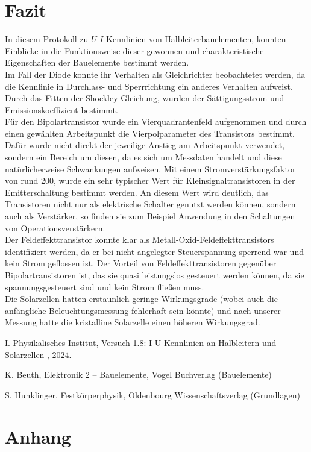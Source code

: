 \documentclass[12pt,a4paper,ngerman]{report}
\begin{document}
\chapter{Fazit}
In diesem Protokoll zu $U$-$I$-Kennlinien von Halbleiterbauelementen, konnten Einblicke in die Funktionsweise dieser gewonnen und charakteristische Eigenschaften der Bauelemente bestimmt werden.\\
Im Fall der Diode konnte ihr Verhalten als Gleichrichter beobachtetet werden, da die Kennlinie in Durchlass- und Sperrrichtung ein anderes Verhalten aufweist. Durch das Fitten der Shockley-Gleichung, wurden der Sättigungsstrom und Emissionskoeffizient bestimmt.\\
Für den Bipolartransistor wurde ein Vierquadrantenfeld aufgenommen und durch einen gewählten Arbeitspunkt die Vierpolparameter des Transistors bestimmt. Dafür wurde nicht direkt der jeweilige Anstieg am Arbeitspunkt verwendet, sondern ein Bereich um diesen, da es sich um Messdaten handelt und diese natürlicherweise Schwankungen aufweisen. Mit einem Stromverstärkungsfaktor von rund 200, wurde ein sehr typischer Wert für Kleinsignaltransistoren in der Emitterschaltung bestimmt werden. An diesem Wert wird deutlich, das Transistoren nicht nur als elektrische Schalter genutzt werden können, sondern auch als Verstärker, so finden sie zum Beispiel Anwendung in den Schaltungen von Operationsverstärkern.\\
Der Feldeffekttransistor konnte klar als  Metall-Oxid-Feldeffekttransistors identifiziert werden, da er bei nicht angelegter Steuerspannung sperrend war und kein Strom geflossen ist. Der Vorteil von Feldeffekttransistoren gegenüber Bipolartransistoren ist, das sie quasi leistungslos gesteuert werden können, da sie spannungsgesteuert sind und kein Strom fließen muss.\\
Die Solarzellen hatten erstaunlich geringe Wirkungsgrade (wobei auch die anfängliche Beleuchtungsmessung fehlerhaft sein könnte) und nach unserer Messung hatte die kristalline Solarzelle einen höheren Wirkungsgrad.



	\listoffigures
	
	\begin{thebibliography}{111} 
		I. Physikalisches Institut, \glqq Versuch 1.8: I-U-Kennlinien an Halbleitern
		und Solarzellen \grqq{}, 2024.
		
		K. Beuth, \glqq Elektronik 2 – Bauelemente\grqq, Vogel Buchverlag (Bauelemente)
		
		S. Hunklinger, \glqq Festkörperphysik\grqq, Oldenbourg Wissenschaftsverlag (Grundlagen)
		
		
		
	\end{thebibliography}


\chapter*{Anhang} \label{ch:Anhang}
\FloatBarrier
\end{document}
